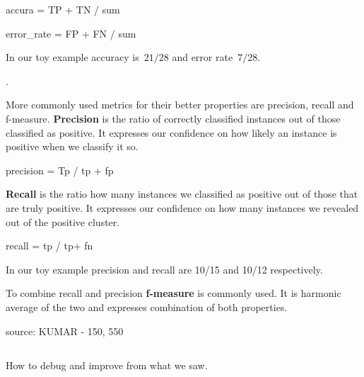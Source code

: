 
accura = TP + TN / sum

error\_rate = FP + FN / sum

In our toy example accuracy is~$21/28$ and error rate~$7/28$.

.

More commonly used metrics for their better properties are precision, recall and f-measure.
{\bf Precision} is the ratio of correctly classified instances out of those classified as positive.
It expresses our confidence on how likely an instance is positive when we classify it so.

precision = Tp / tp + fp

{\bf Recall} is the ratio how many instances we classified as positive out of those that are truly positive.
It expresses our confidence on how many instances we revealed out of the positive cluster.

recall = tp / tp+ fn

In our toy example precision and recall are 10/15 and 10/12 respectively.

To combine recall and precision {\bf f-measure} is commonly used.
It is harmonic average of the two and expresses combination of both properties.



{source: KUMAR - 150, 550}




\subsection{}

\subsection{}

How to debug and improve from what we saw.

\subsection{}
